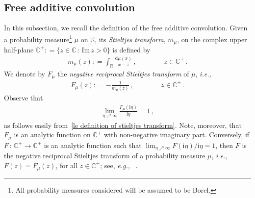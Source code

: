 \documentclass[10pt,reqno]{amsart}
\numberwithin{equation}{section}
\theoremstyle{plain}
\numberwithin{kevin}{section}
\theoremstyle{remark}
\newcommand{\im}{\mathrm{Im}\,}
\newcommand{\R}{{\mathbb R }}
\newcommand{\C}{{\mathbb C}}
\newcommand{\ii}{\mathrm{i}}
\newcommand{\deq}{\mathrel{\mathop:}=}
\newcommand{\dd}{\mathrm{d}}
\newcommand{\ie}{\emph{i.e., }}
\newcommand{\eg}{\emph{e.g., }}
\begin{document}
\subsection{Free additive convolution} \label{le subsection additive convolution} 
In this subsection, we recall the definition of the free additive convolution. Given a probability measure\footnote{All probability measures considered will be assumed to be Borel.} $\mu$ on $\R$, its {\it Stieltjes transform}, $m_\mu$, on the complex upper half-plane $\C^+\deq\{ z\in\C\,:\, \im z>0\}$ is defined by
\begin{align}\label{le definition of stieltjes transform}
 m_\mu(z)\deq\int_\R\frac{\dd\mu(x)}{x-z}\,, \qquad\qquad z\in\C^+\,.
\end{align}
We denote by $F_\mu$ the {\it negative reciprocal Stieltjes transform} of $\mu$, \ie
\begin{align}\label{le F definition}
 F_{\mu}(z)\deq -\frac{1}{m_{\mu}(z)}\,,\qquad \qquad z\in\C^+\,.
\end{align}
Observe that
 \begin{align}\label{le F behaviour at infinity}
\lim_{\eta\nearrow \infty}\frac{F_{\mu}(\ii\eta)}{\ii\eta}=1\,,
\end{align}
as follows easily from~\eqref{le definition of stieltjes transform}. Note, moreover, that $F_\mu$ is an analytic function on $\C^+$ with non-negative imaginary part. Conversely, if $F\,:\, \C^+\rightarrow \C^+$ is an analytic function such that $\lim_{\eta\nearrow\infty}  F(\ii\eta)/\ii\eta=1$, then $F$ is the negative reciprocal Stieltjes transform of a probability measure $\mu$, \ie $F(z)=F_\mu(z)$, for all $z\in\C^+$; see, \eg ~\cite{Aki}. 
\end{document}

